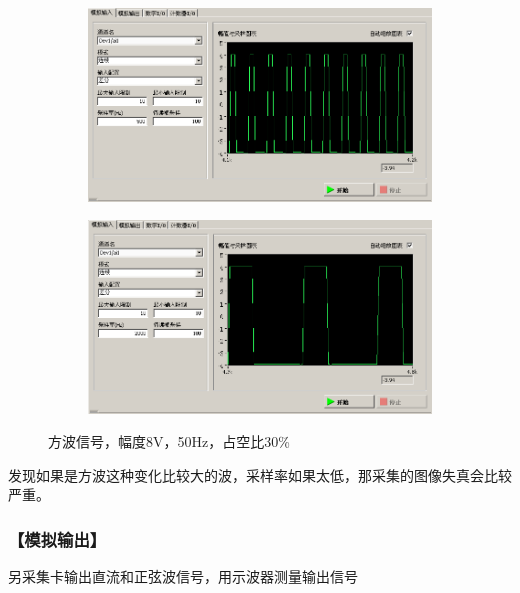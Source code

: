 \documentclass{ctexart}
\let\oldsubsubsection\subsubsection
\renewcommand{\subsubsection}[1]{\oldsubsubsection{\!\!\!\!\!\!【#1】}}
\begin{document}
\begin{figure}[H]
  \centering
  \begin{subfigure}{0.48\linewidth}
    \includegraphics[width=\linewidth]{LabVIEW使用基础/信号测量系统测试/模拟输入/方波/虚拟仪器_采样率500.PNG}
  \end{subfigure}
  \begin{subfigure}{0.48\linewidth}
    \includegraphics[width=\linewidth]{LabVIEW使用基础/信号测量系统测试/模拟输入/方波/虚拟仪器_采样率2000.PNG}
  \end{subfigure}
  \caption{方波信号，幅度8V，50Hz，占空比30\%}
\end{figure}

发现如果是方波这种变化比较大的波，采样率如果太低，那采集的图像失真会比较严重。

\subsubsection{模拟输出}

另采集卡输出直流和正弦波信号，用示波器测量输出信号
\end{document}
